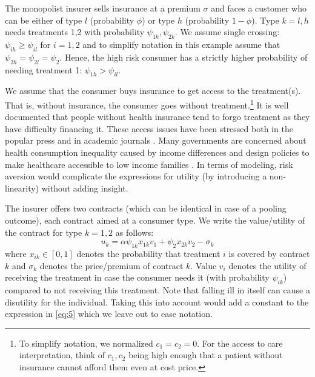 \documentclass[12pt,english,a4paper]{article}
\begin{document}
The monopolist insurer sells insurance at a premium \(\sigma\) and faces a customer who can be either of type \(l\) (probability \(\phi\)) or type \(h\) (probability \(1-\phi\)). Type \(k=l,h\) needs treatments 1,2 with probability \(\psi_{1k},\psi_{2k}\). We assume single crossing: \(\psi_{ih} \geq \psi_{il}\) for \(i=1,2\) and to simplify notation in this example assume that \(\psi_{2h} = \psi_{2l} = \psi_2\). Hence, the high risk consumer has a strictly higher probability of needing treatment 1: \(\psi_{1h}>\psi_{il}\).

We assume that the consumer buys insurance to get access to the treatment(s). That is, without insurance, the consumer goes without treatment.\footnote{To simplify notation, we normalized \(c_1=c_2=0\). For the access to care interpretation, think of \(c_1,c_2\) being high enough that a patient without insurance cannot afford them even at cost price.} It is well documented that people without health insurance tend to forgo treatment as they have difficulty financing it. These access issues have been stressed both in the popular press \citep{Cohn07} and in academic journals \citep{Nyman1999141,Schoen2008,Schoen2010a}. Many governments are concerned about health consumption inequality caused by income differences and design policies to make healthcare accessible to low income families \citep{Schokkaert2011o}. In terms of modeling, risk aversion would complicate the expressions for utility (by introducing a non-linearity) without adding insight.

The insurer offers two contracts (which can be identical in case of a pooling outcome), each contract aimed at a consumer type. We write the value/utility of the contract for type \(k=1,2\) as follows:
\begin{equation}
\label{eq:5}
u_{k} = \alpha \psi_{1k} x_{1k} v_1 + \psi_{2} x_{2k} v_2 - \sigma_k
\end{equation}
where \(x_{ik} \in [0,1]\) denotes the probability that treatment \(i\) is covered by contract \(k\) and \(\sigma_k\) denotes the price/premium of contract \(k\). Value \(v_i\) denotes the utility of receiving the treatment in case the consumer needs it (with probability \(\psi_{ik}\)) compared to not receiving this treatment. Note that falling ill in itself can cause a disutility for the individual. Taking this into account would add a constant to the expression in \eqref{eq:5} which we leave out to ease notation.
\end{document}
